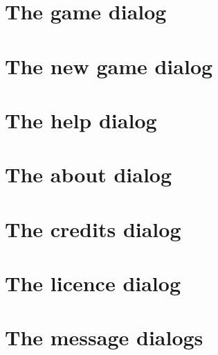 \section{The  game dialog} \label{dlg:Game}



\section{The new game dialog} \label{dlg:NewGame}



\section{The help dialog} \label{dlg:Help}



\section{The about  dialog} \label{dlg:AboutCX}



\section{The credits dialog} \label{dlg:Credits}



\section{The licence dialog} \label{dlg:Licence}



\section{The message dialogs} \label{dlg::messageBox}



